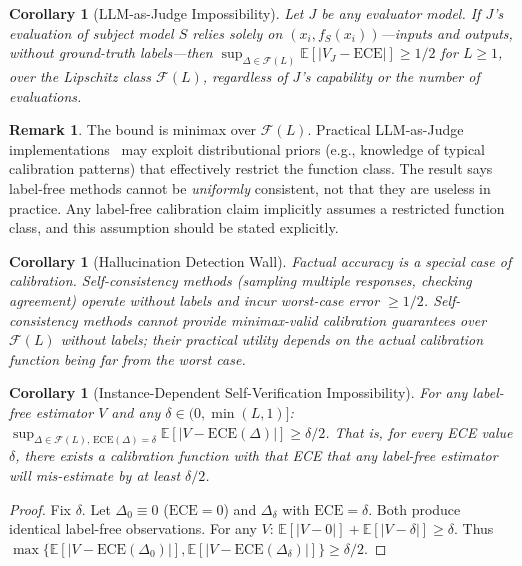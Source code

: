 \documentclass{article}
\newcommand{\ECE}{\mathrm{ECE}}
\newcommand{\cF}{\mathcal{F}}
\newcommand{\Lip}{L}
\newcommand{\calmap}{\Delta}
\providecommand{\E}{}
\renewcommand{\E}{\mathbb{E}}
\newcommand{\targetacc}{\delta}
\newtheorem{corollary}[theorem]{Corollary}
\theoremstyle{definition}
\newtheorem{remark}[theorem]{Remark}
\begin{document}
\begin{corollary}[LLM-as-Judge Impossibility]
\label{cor:llm-judge}
Let $J$ be any evaluator model. If $J$'s evaluation of subject model $S$ relies solely on $(x_i, f_S(x_i))$---inputs and outputs, without ground-truth labels---then $\sup_{\calmap \in \cF(\Lip)} \E[|V_J - \ECE|] \geq 1/2$ for $\Lip \geq 1$, over the Lipschitz class $\cF(\Lip)$, regardless of $J$'s capability or the number of evaluations.
\end{corollary}

\begin{remark}
The bound is minimax over $\cF(\Lip)$. Practical LLM-as-Judge implementations~\citep{zheng2023judging} may exploit distributional priors (e.g., knowledge of typical calibration patterns) that effectively restrict the function class. The result says label-free methods cannot be \emph{uniformly} consistent, not that they are useless in practice. Any label-free calibration claim implicitly assumes a restricted function class, and this assumption should be stated explicitly.
\end{remark}

\begin{corollary}[Hallucination Detection Wall]
\label{cor:hallucination}
Factual accuracy is a special case of calibration. Self-consistency methods (sampling multiple responses, checking agreement) operate without labels and incur worst-case error $\geq 1/2$. Self-consistency methods cannot provide minimax-valid calibration guarantees over $\cF(\Lip)$ without labels; their practical utility depends on the actual calibration function being far from the worst case.
\end{corollary}

\begin{corollary}[Instance-Dependent Self-Verification Impossibility]
\label{cor:selfverify_instance}
For any label-free estimator $V$ and any $\targetacc \in (0, \min(\Lip, 1)]$:
$\sup_{\calmap \in \cF(\Lip),\, \ECE(\calmap) = \targetacc} \E[|V - \ECE(\calmap)|] \geq \targetacc/2$.
That is, for \emph{every} ECE value $\targetacc$, there exists a calibration function with that ECE that any label-free estimator will mis-estimate by at least $\targetacc/2$.
\end{corollary}
\begin{proof}
Fix $\targetacc$. Let $\calmap_0 \equiv 0$ ($\ECE = 0$) and $\calmap_\targetacc$ with $\ECE = \targetacc$. Both produce identical label-free observations. For any $V$: $\E[|V - 0|] + \E[|V - \targetacc|] \geq \targetacc$. Thus $\max\{\E[|V - \ECE(\calmap_0)|], \E[|V - \ECE(\calmap_\targetacc)|]\} \geq \targetacc/2$.
\end{proof}
\end{document}
